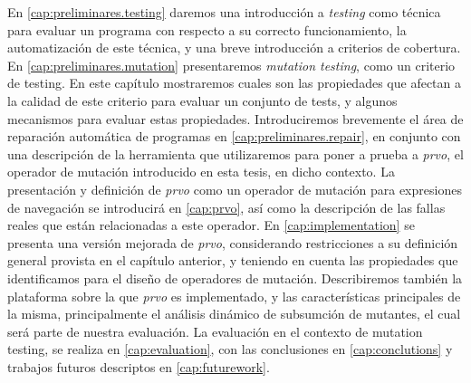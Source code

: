 En \ref{cap:preliminares.testing} daremos una introducci\'on a \emph{testing} como t\'ecnica para evaluar un programa con respecto a su correcto funcionamiento, la automatizaci\'on de este t\'ecnica, y una breve introducci\'on a criterios de cobertura. En \ref{cap:preliminares.mutation} presentaremos \emph{mutation testing}, como un criterio de testing. En este cap\'itulo mostraremos cuales son las propiedades que afectan a la calidad de este criterio para evaluar un conjunto de tests, y algunos mecanismos para evaluar estas propiedades. Introduciremos brevemente el \'area de reparaci\'on autom\'atica de programas en \ref{cap:preliminares.repair}, en conjunto con una descripci\'on de la herramienta que utilizaremos para poner a prueba a \emph{prvo}, el operador de mutaci\'on introducido en esta tesis, en dicho contexto. La presentaci\'on y definici\'on de \emph{prvo} como un operador de mutaci\'on para expresiones de navegaci\'on se introducir\'a en \ref{cap:prvo}, as\'i como la descripci\'on de las fallas reales que est\'an relacionadas a este operador. En \ref{cap:implementation} se presenta una versi\'on mejorada de \emph{prvo}, considerando restricciones a su definici\'on general provista en el cap\'itulo anterior, y teniendo en cuenta las propiedades que identificamos para el dise\~no de operadores de mutaci\'on. Describiremos tambi\'en la plataforma sobre la que \emph{prvo} es implementado, y las caracter\'isticas principales de la misma, principalmente el an\'alisis din\'amico de subsumci\'on de mutantes, el cual ser\'a parte de nuestra evaluaci\'on. La evaluaci\'on en el contexto de mutation testing, se realiza en \ref{cap:evaluation}, con las conclusiones en \ref{cap:conclutions} y trabajos futuros descriptos en \ref{cap:futurework}.

